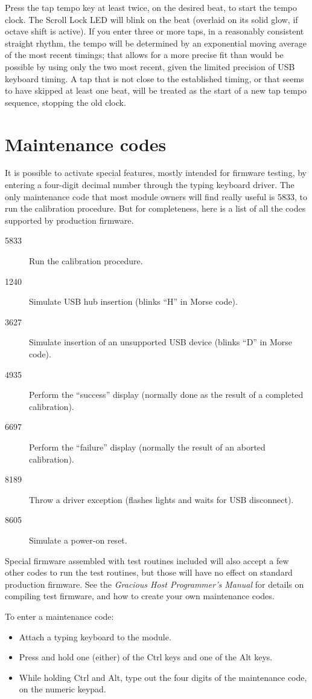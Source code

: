 Press the tap tempo key at least twice, on the desired beat, to start the
tempo clock.  The Scroll Lock LED will blink on the beat (overlaid on its
solid glow, if octave shift is active).  If you enter three or more taps, in
a reasonably consistent straight rhythm, the tempo will be determined by an
exponential moving average of the most recent timings; that allows for a
more precise fit than would be possible by using only the two most recent,
given the limited precision of USB keyboard timing.  A tap that is not close
to the established timing, or that seems to have skipped at least one beat,
will be treated as the start of a new tap tempo sequence, stopping the old
clock.


\section{Maintenance codes}

It is possible to activate special features, mostly intended for firmware
testing, by entering a four-digit decimal number through the typing
keyboard driver.  The only maintenance code that most module owners will
find really useful is 5833, to run the calibration procedure.  But for
completeness, here is a list of all the codes supported by production
firmware.

\begin{description}
\item[5833] Run the calibration procedure.
\item[1240] Simulate USB hub insertion (blinks ``H'' in Morse code).
\item[3627] Simulate insertion of an unsupported USB device (blinks ``D'' in
Morse code).
\item[4935] Perform the ``success'' display (normally done as the result of a
completed calibration).
\item[6697] Perform the ``failure'' display (normally the result of an aborted
calibration).
\item[8189] Throw a driver exception (flashes lights and waits for USB
disconnect).
\item[8605] Simulate a power-on reset.
\end{description}

Special firmware assembled with test routines included will also accept a
few other codes to run the test routines, but those will have no effect on
standard production firmware.  See the \emph{Gracious Host Programmer's
Manual} for details on compiling test firmware, and how to
create your own maintenance codes.

To enter a maintenance code:

\begin{itemize}
\item Attach a typing keyboard to the module.
\item Press and hold one (either) of the Ctrl keys and one of the Alt keys.
\item While holding Ctrl and Alt, type out the four digits of the
maintenance code, on the numeric keypad.
\end{itemize}
